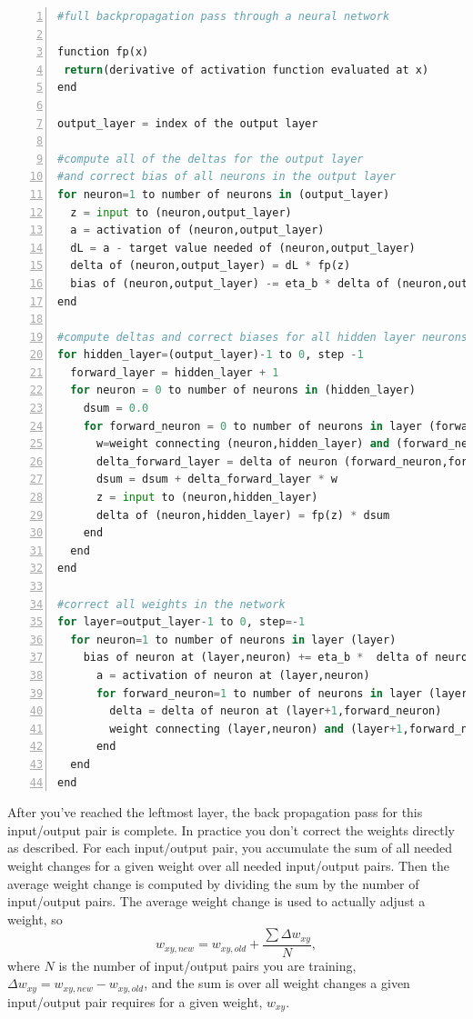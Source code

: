 \documentclass[12pt]{article}
\begin{document}
\begin{lstlisting}[language=Python,
		basicstyle=\small\ttfamily,
                 numbers=left,
                 stepnumber=1,
                 numbersep=8pt,
                 tabsize=2,
                 showspaces=false,
                 breaklines=true,
                 showstringspaces=false,
                 columns=fullflexible]
#full backpropagation pass through a neural network

function fp(x)
 return(derivative of activation function evaluated at x)
end

output_layer = index of the output layer

#compute all of the deltas for the output layer
#and correct bias of all neurons in the output layer
for neuron=1 to number of neurons in (output_layer)
  z = input to (neuron,output_layer)
  a = activation of (neuron,output_layer)
  dL = a - target value needed of (neuron,output_layer)
  delta of (neuron,output_layer) = dL * fp(z)
  bias of (neuron,output_layer) -= eta_b * delta of (neuron,output_layer)
end
 
#compute deltas and correct biases for all hidden layer neurons
for hidden_layer=(output_layer)-1 to 0, step -1
  forward_layer = hidden_layer + 1
  for neuron = 0 to number of neurons in (hidden_layer)
    dsum = 0.0
    for forward_neuron = 0 to number of neurons in layer (forward_layer)
      w=weight connecting (neuron,hidden_layer) and (forward_neuron,hidden_layer)
      delta_forward_layer = delta of neuron (forward_neuron,forward_layer)
      dsum = dsum + delta_forward_layer * w
      z = input to (neuron,hidden_layer)
      delta of (neuron,hidden_layer) = fp(z) * dsum
    end
  end
end

#correct all weights in the network
for layer=output_layer-1 to 0, step=-1
  for neuron=1 to number of neurons in layer (layer)
    bias of neuron at (layer,neuron) += eta_b *  delta of neuron at (layer,neuron)
      a = activation of neuron at (layer,neuron)
      for forward_neuron=1 to number of neurons in layer (layer+1)
        delta = delta of neuron at (layer+1,forward_neuron)
        weight connecting (layer,neuron) and (layer+1,forward_neuron) -= eta * delta * a
      end
  end
end
\end{lstlisting}


After you've reached the leftmost layer, the back propagation pass for this input/output pair is complete. In practice you don't correct the weights directly as described. For each input/output pair, you accumulate the sum of all needed weight changes for a given weight over all needed input/output pairs. Then the average weight change is computed by dividing the sum by the number of input/output pairs.  The average weight change is used to actually adjust a weight, so
\begin{equation}
w_{xy,new}=w_{xy,old} + \frac{\sum \Delta w_{xy}}{N},
\end{equation}
where $N$ is the number of input/output pairs you are training,  $\Delta w_{xy}=w_{xy,new}-w_{xy,old}$, and the sum is over all weight changes a given input/output pair requires for a given weight, $w_{xy}$.
\end{document}
